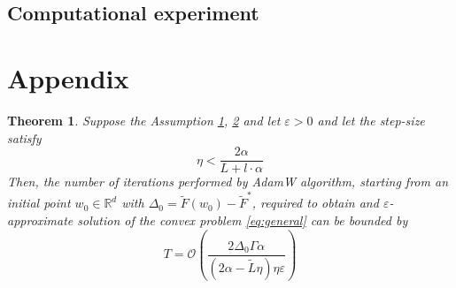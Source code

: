 \documentclass{article}
\newtheorem{theorem}{Theorem}
\begin{document}
\subsection{Computational experiment}









\newpage
\section{Appendix}
\begin{theorem}
Suppose the Assumption \hyperref[ass:convex]{1}, \hyperref[ass:Lsmoothness]{2} and let $\varepsilon > 0$ and let the step-size satisfy
\begin{equation*}
    \eta < \frac{2 \alpha}{L + l \cdot \alpha} 
\end{equation*}
Then, the number of iterations performed by AdamW algorithm, starting from an initial point $w_0 \in \mathbb{R}^d$ with $\Delta_0 = \tilde{F}(w_0) - \tilde{F}^*$, required to obtain and $\varepsilon$-approximate solution of the convex problem \eqref{eq:general} can be bounded by
\begin{equation*}
      T = \mathcal{O}\left( \frac{2\Delta_0 \Gamma \alpha } {(2\alpha - \tilde{L}\eta) \eta \varepsilon} \right)
\end{equation*}

\end{theorem}
\end{document}
